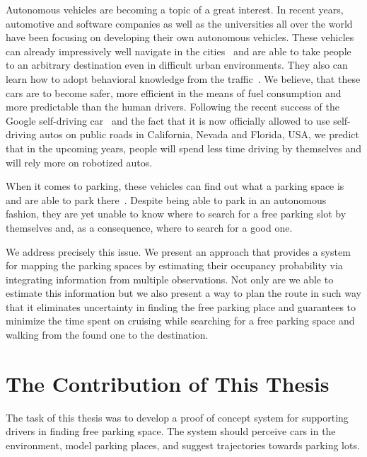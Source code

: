 Autonomous vehicles are becoming a topic of a great interest. In recent years,
automotive and software companies as well as the universities all over the
world have been focusing on developing their own autonomous vehicles. These
vehicles can already impressively well navigate in the
cities~\cite{stanley_auto_car,perceprion_drivec_car,lima13,daimler} and are
able to take people to an arbitrary destination even in difficult urban
environments. They also can learn how to adopt behavioral knowledge from the
traffic~\cite{behaviour_learning,spinello10:multiclass}. We believe, that
these cars are to become safer, more efficient in the means of fuel
consumption and more predictable than the human drivers. Following the recent
success of the Google self-driving car~\cite{markoff2010google} and the fact
that it is now officially allowed to use self-driving autos on public roads in
California, Nevada and Florida, USA, we predict that in the upcoming years,
people will spend less time driving by themselves and will rely more on
robotized autos.

When it comes to parking, these vehicles can find out what a parking space is
and are able to park
there~\cite{auto_cars_burgard,auto_parking09,auto_park2_11}. Despite being
able to park in an autonomous fashion, they are yet unable to know where to
search for a free parking slot by themselves and, as a consequence, where to
search for a good one.

We address precisely this issue. We present an approach that provides a system
for mapping the parking spaces by estimating their occupancy probability via
integrating information from multiple observations. Not only are we able to
estimate this information but we also present a way to plan the route in such
way that it eliminates uncertainty in finding the free parking place and
guarantees to minimize the time spent on cruising while searching for a free
parking space and walking from the found one to the destination.

\section{The Contribution of This Thesis} %
\label{sec:the_contribution_of_this_thesis}

    The task of this thesis was to develop a proof of concept system for
    supporting drivers in finding free parking space. The system should
    perceive cars in the environment, model parking places, and suggest
    trajectories towards parking lots.

